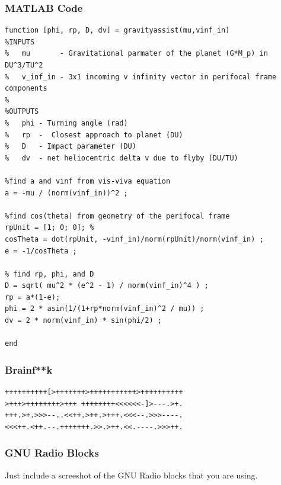 \subsubsection{MATLAB Code}
\begin{verbatim}
function [phi, rp, D, dv] = gravityassist(mu,vinf_in)
%INPUTS
%   mu       - Gravitational parmater of the planet (G*M_p) in DU^3/TU^2
%   v_inf_in - 3x1 incoming v infinity vector in perifocal frame components
%
%OUTPUTS
%   phi - Turning angle (rad)
%   rp  -  Closest approach to planet (DU)
%   D   - Impact parameter (DU)
%   dv  - net heliocentric delta v due to flyby (DU/TU)

%find a and vinf from vis-viva equation
a = -mu / (norm(vinf_in))^2 ;

%find cos(theta) from geometry of the perifocal frame
rpUnit = [1; 0; 0]; % 
cosTheta = dot(rpUnit, -vinf_in)/norm(rpUnit)/norm(vinf_in) ;
e = -1/cosTheta ;

% find rp, phi, and D
D = sqrt( mu^2 * (e^2 - 1) / norm(vinf_in)^4 ) ;
rp = a*(1-e);
phi = 2 * asin(1/(1+rp*norm(vinf_in)^2 / mu)) ;
dv = 2 * norm(vinf_in) * sin(phi/2) ;

end
\end{verbatim}

\subsubsection{Brainf**k}
\begin{verbatim}
++++++++++[>+++++++>+++++++++++>++++++++++
>+++>++++++++>+++ ++++++++<<<<<<-]>---.>+.
+++.>+.>>>--..<<++.>++.>+++.<<<--.>>>----.
<<<++.<++.--.+++++++.>>.>++.<<.----.>>>++.
\end{verbatim}

\subsubsection{GNU Radio Blocks}
Just include a screeshot of the GNU Radio blocks that you are using.
